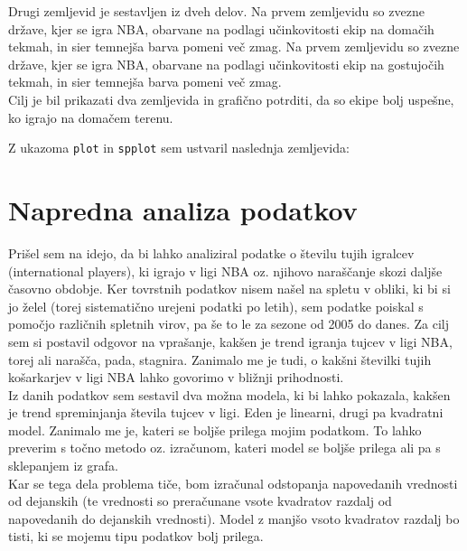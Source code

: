 \documentclass[11pt,a4paper]{article}
\begin{document}
Drugi zemljevid je sestavljen iz dveh delov. 
Na prvem zemljevidu so zvezne države, kjer se igra NBA, obarvane na podlagi učinkovitosti ekip na domačih tekmah, in sier temnejša barva pomeni več zmag.
Na prvem zemljevidu so zvezne države, kjer se igra NBA, obarvane na podlagi učinkovitosti ekip na gostujočih tekmah, in sier temnejša barva pomeni več zmag.\\
Cilj je bil prikazati dva zemljevida in grafično potrditi, da so ekipe bolj uspešne, ko igrajo na domačem terenu.

Z ukazoma \verb|plot| in \verb|spplot| sem ustvaril naslednja zemljevida:






\section{Napredna analiza podatkov}

Prišel sem na idejo, da bi lahko analiziral podatke o številu tujih igralcev (international players), ki igrajo v ligi NBA oz. njihovo naraščanje skozi daljše časovno obdobje. Ker tovrstnih podatkov nisem našel na spletu v obliki, ki bi si jo želel (torej sistematično urejeni podatki po letih), sem podatke poiskal s pomočjo različnih spletnih virov, pa še to le za sezone od 2005 do danes. Za cilj sem si postavil odgovor na vprašanje, kakšen je trend igranja tujcev v ligi NBA, torej ali narašča, pada, stagnira. Zanimalo me je tudi, o kakšni številki tujih košarkarjev v ligi NBA lahko govorimo v bližnji prihodnosti.\\

Iz danih podatkov sem sestavil dva možna modela, ki bi lahko pokazala, kakšen je trend spreminjanja števila tujcev v ligi. Eden je linearni, drugi pa kvadratni model. Zanimalo me je, kateri se boljše prilega mojim podatkom. 
To lahko preverim s točno metodo oz. izračunom, kateri model se boljše prilega ali pa s sklepanjem iz grafa. \\

Kar se tega dela problema tiče, bom izračunal odstopanja napovedanih vrednosti od dejanskih (te vrednosti so preračunane vsote kvadratov razdalj od napovedanih do dejanskih vrednosti). Model z manjšo vsoto kvadratov razdalj bo tisti, ki se mojemu tipu podatkov bolj prilega.\\
\end{document}

